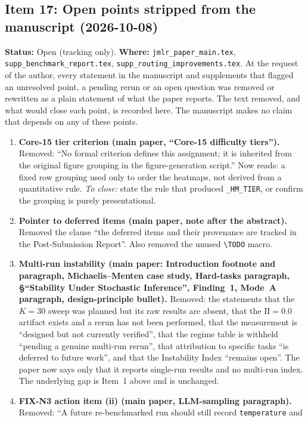 \documentclass[11pt]{article}
\newcommand{\II}{\mathrm{II}}
\begin{document}
\subsection*{Item 17: Open points stripped from the manuscript (2026-10-08)}
\textbf{Status:} Open (tracking only). \textbf{Where:} \texttt{jmlr\_paper\_main.tex}, \texttt{supp\_benchmark\_report.tex},
\texttt{supp\_routing\_improvements.tex}. At the request of the author, every statement in the manuscript and supplements that
flagged an unresolved point, a pending rerun or an open question was removed or rewritten as a plain statement of what the paper reports.
The text removed, and what would close each point, is recorded here. The manuscript makes no claim that depends on any of these points.
\begin{enumerate}\small
\item \textbf{Core-15 tier criterion (main paper, ``Core-15 difficulty tiers'').} Removed: ``No formal criterion defines this assignment;
it is inherited from the original figure grouping in the figure-generation script.'' Now reads: a fixed row grouping used only to order the heatmaps,
not derived from a quantitative rule. \emph{To close:} state the rule that produced \texttt{\_HM\_TIER}, or confirm the grouping is purely presentational.
\item \textbf{Pointer to deferred items (main paper, note after the abstract).} Removed the clause ``the deferred items and their provenance are tracked in
the Post-Submission Report''. Also removed the unused \texttt{\textbackslash TODO} macro.
\item \textbf{Multi-run instability (main paper: Introduction footnote and paragraph, Michaelis--Menten case study, Hard-tasks paragraph,
\S``Stability Under Stochastic Inference'', Finding~1, Mode~A paragraph, design-principle bullet).} Removed: the statements that the $K=30$ sweep was planned but its
raw results are absent, that the $\II=0.0$ artifact exists and a rerun has not been performed, that the measurement is ``designed but not currently verified'', that the
regime table is withheld ``pending a genuine multi-run rerun'', that attribution to specific tasks ``is deferred to future work'', and that the Instability Index ``remains open''.
The paper now says only that it reports single-run results and no multi-run index. The underlying gap is Item~1 above and is unchanged.
\item \textbf{FIX-N3 action item (ii) (main paper, LLM-sampling paragraph).} Removed: ``A future re-benchmarked run should still record \texttt{temperature} and

\end{enumerate}
\end{document}
